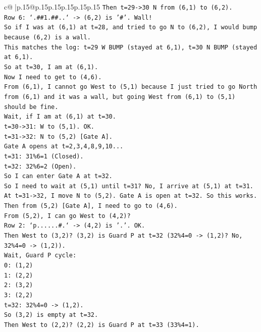 \documentclass{article}
\begin{document}
{\begin{supertabular}{c@{$\;$}|p{.15\linewidth}@{}p{.15\linewidth}p{.15\linewidth}p{.15\linewidth}p{.15\linewidth}p{.15\linewidth}}
{{{\texttt{Then t=29{-}>30 N from (6,1) to (6,2).} \\
\texttt{Row 6: `.\#\#1.\#\#..` {-}> (6,2) is '\#'. Wall!} \\
\texttt{So if I was at (6,1) at t=28, and tried to go N to (6,2), I would bump because (6,2) is a wall.} \\
\texttt{This matches the log: t=29 W BUMP (stayed at 6,1), t=30 N BUMP (stayed at 6,1).} \\
\texttt{So at t=30, I am at (6,1).} \\
\texttt{Now I need to get to (4,6).} \\
\texttt{From (6,1), I cannot go West to (5,1) because I just tried to go North from (6,1) and it was a wall, but going West from (6,1) to (5,1) should be fine.} \\
\texttt{Wait, if I am at (6,1) at t=30.} \\
\texttt{t=30{-}>31: W to (5,1). OK.} \\
\texttt{t=31{-}>32: N to (5,2) {[}Gate A{]}.} \\
\texttt{Gate A opens at t=2,3,4,8,9,10...} \\
\texttt{t=31: 31\%6=1 (Closed).} \\
\texttt{t=32: 32\%6=2 (Open).} \\
\texttt{So I can enter Gate A at t=32.} \\
\texttt{So I need to wait at (5,1) until t=31? No, I arrive at (5,1) at t=31.} \\
\texttt{At t=31{-}>32, I move N to (5,2). Gate A is open at t=32. So this works.} \\
\texttt{Then from (5,2) {[}Gate A{]}, I need to go to (4,6).} \\
\texttt{From (5,2), I can go West to (4,2)?} \\
\texttt{Row 2: `p......\#.` {-}> (4,2) is '.'. OK.} \\
\texttt{Then West to (3,2)? (3,2) is Guard P at t=32 (32\%4=0 {-}> (1,2)? No, 32\%4=0 {-}> (1,2)).} \\
\texttt{Wait, Guard P cycle:} \\
\texttt{0: (1,2)} \\
\texttt{1: (2,2)} \\
\texttt{2: (3,2)} \\
\texttt{3: (2,2)} \\
\texttt{t=32: 32\%4=0 {-}> (1,2).} \\
\texttt{So (3,2) is empty at t=32.} \\
\texttt{Then West to (2,2)? (2,2) is Guard P at t=33 (33\%4=1).} \\
}}}
\end{supertabular}}
\end{document}
